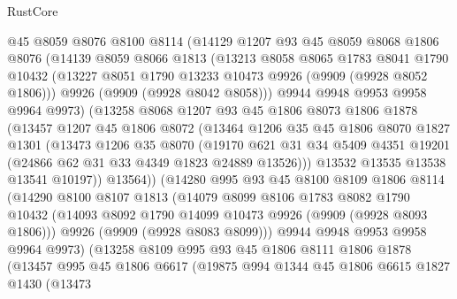 \begin{lexlean}{RustCore}
\begin{coremodule}
        @45
        @8059
        @8076
        @8100
        @8114
        (@14129
          @1207
          @93
          @45
          @8059
          @8068
          @1806
          @8076
          (@14139
            @8059
            @8066
            @1813
            (@13213
              @8058
              @8065
              @1783
              @8041
              @1790
              @10432
              (@13227 @8051 @1790 @13233 @10473 @9926 (@9909 (@9928 @8052 @1806)))
              @9926
              (@9909 (@9928 @8042 @8058)))
            @9944
            @9948
            @9953
            @9958
            @9964
            @9973)
          (@13258
            @8068
            @1207
            @93
            @45
            @1806
            @8073
            @1806
            @1878
            (@13457
              @1207
              @45
              @1806
              @8072
              (@13464
                @1206
                @35
                @45
                @1806
                @8070
                @1827
                @1301
                (@13473
                  @1206
                  @35
                  @8070
                  (@19170
                    @621
                    @31
                    @34
                    @5409
                    @4351
                    @19201
                    (@24866 @62 @31 @33 @4349 @1823 @24889 @13526)))
                @13532
                @13535
                @13538
                @13541
                @10197))
            @13564))
        (@14280
          @995
          @93
          @45
          @8100
          @8109
          @1806
          @8114
          (@14290
            @8100
            @8107
            @1813
            (@14079
              @8099
              @8106
              @1783
              @8082
              @1790
              @10432
              (@14093 @8092 @1790 @14099 @10473 @9926 (@9909 (@9928 @8093 @1806)))
              @9926
              (@9909 (@9928 @8083 @8099)))
            @9944
            @9948
            @9953
            @9958
            @9964
            @9973)
          (@13258
            @8109
            @995
            @93
            @45
            @1806
            @8111
            @1806
            @1878
            (@13457
              @995
              @45
              @1806
              @6617
              (@19875
                @994
                @1344
                @45
                @1806
                @6615
                @1827
                @1430
                (@13473

\end{coremodule}
\end{lexlean}
